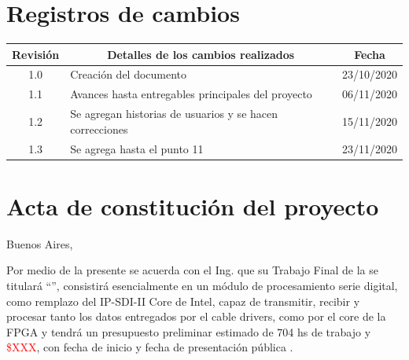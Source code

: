 \documentclass[11pt]{charter}
\begin{document}
\maketitle
\thispagestyle{empty}
\pagebreak


\thispagestyle{empty}
{\setlength{\parskip}{0pt}
\tableofcontents{}
}
\pagebreak


\section{Registros de cambios}
\label{sec:registro}


\begin{table}[ht]
\label{tab:registro}
\centering
\begin{tabularx}{\linewidth}{@{}|c|X|c|@{}}
\hline
\rowcolor[HTML]{C0C0C0} 
Revisión & \multicolumn{1}{c|}{\cellcolor[HTML]{C0C0C0}Detalles de los cambios realizados} & Fecha      \\ \hline
1.0      & Creación del documento                                          & 23/10/2020 \\ \hline
1.1      & Avances hasta entregables principales del proyecto & 06/11/2020 \\ \hline
1.2      & Se agregan historias de usuarios y se hacen correcciones & 15/11/2020 \\ \hline
1.3      & Se agrega hasta el punto 11 & 23/11/2020 \newline
\end{tabularx}
\end{table}

\pagebreak

\section{Acta de constitución del proyecto}
\label{sec:acta}

\begin{flushright}
Buenos Aires, \fechaInicioName
\end{flushright}

\vspace{2cm}

Por medio de la presente se acuerda con el Ing. \authorname\hspace{1px} que su Trabajo Final de la \degreename\hspace{1px} se titulará ``\ttitle'', consistirá esencialmente en un módulo de procesamiento serie digital, como remplazo del IP-SDI-II Core de Intel, capaz de transmitir, recibir y procesar tanto los datos entregados por el cable drivers, como por el core de la FPGA y tendrá un presupuesto preliminar estimado de 704 hs de trabajo y \textcolor{red}{\$XXX}, con fecha de inicio \fechaInicioName\hspace{1px} y fecha de presentación pública \fechaFinalName.
\end{document}
